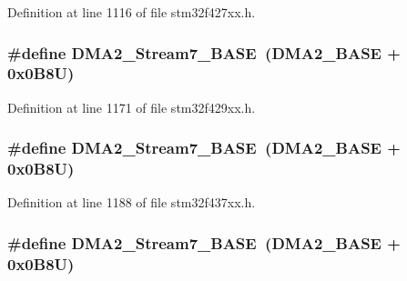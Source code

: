 Definition at line 1116 of file stm32f427xx.\+h.

\subsubsection[{\texorpdfstring{D\+M\+A2\+\_\+\+Stream7\+\_\+\+B\+A\+SE}{DMA2_Stream7_BASE}}]{\setlength{\rightskip}{0pt plus 5cm}\#define D\+M\+A2\+\_\+\+Stream7\+\_\+\+B\+A\+SE~({\bf D\+M\+A2\+\_\+\+B\+A\+SE} + 0x0\+B8\+U)}\hypertarget{group___peripheral__memory__map_gaa9faa708ad2440d24eb1064cba9bb06d}{}\label{group___peripheral__memory__map_gaa9faa708ad2440d24eb1064cba9bb06d}


Definition at line 1171 of file stm32f429xx.\+h.

\subsubsection[{\texorpdfstring{D\+M\+A2\+\_\+\+Stream7\+\_\+\+B\+A\+SE}{DMA2_Stream7_BASE}}]{\setlength{\rightskip}{0pt plus 5cm}\#define D\+M\+A2\+\_\+\+Stream7\+\_\+\+B\+A\+SE~({\bf D\+M\+A2\+\_\+\+B\+A\+SE} + 0x0\+B8\+U)}\hypertarget{group___peripheral__memory__map_gaa9faa708ad2440d24eb1064cba9bb06d}{}\label{group___peripheral__memory__map_gaa9faa708ad2440d24eb1064cba9bb06d}


Definition at line 1188 of file stm32f437xx.\+h.

\subsubsection[{\texorpdfstring{D\+M\+A2\+\_\+\+Stream7\+\_\+\+B\+A\+SE}{DMA2_Stream7_BASE}}]{\setlength{\rightskip}{0pt plus 5cm}\#define D\+M\+A2\+\_\+\+Stream7\+\_\+\+B\+A\+SE~({\bf D\+M\+A2\+\_\+\+B\+A\+SE} + 0x0\+B8\+U)}\hypertarget{group___peripheral__memory__map_gaa9faa708ad2440d24eb1064cba9bb06d}{}\label{group___peripheral__memory__map_gaa9faa708ad2440d24eb1064cba9bb06d}


